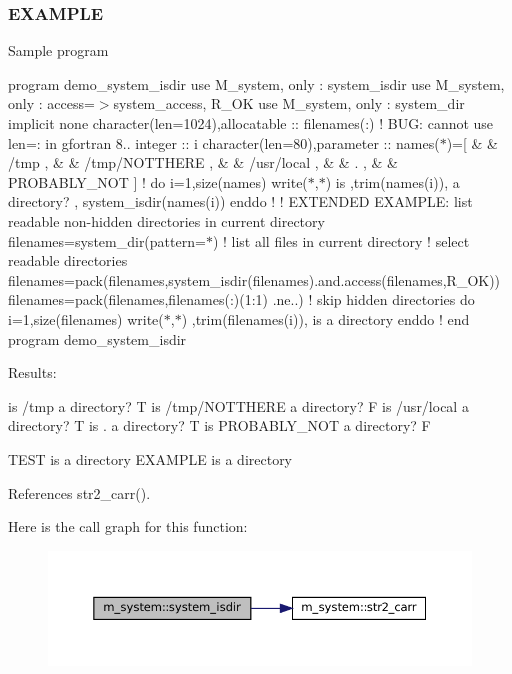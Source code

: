 \subsubsection*{E\+X\+A\+M\+P\+LE}

Sample program

program demo\+\_\+system\+\_\+isdir use M\+\_\+system, only \+: system\+\_\+isdir use M\+\_\+system, only \+: access=$>$system\+\_\+access, R\+\_\+\+OK use M\+\_\+system, only \+: system\+\_\+dir implicit none character(len=1024),allocatable \+:\+: filenames(\+:) ! B\+UG\+: cannot use len=\+: in gfortran 8.. integer \+:\+: i character(len=80),parameter \+:\+: names($\ast$)=\mbox{[} \& \& \textquotesingle{}/tmp \textquotesingle{}, \& \& \textquotesingle{}/tmp/\+N\+O\+T\+T\+H\+E\+RE \textquotesingle{}, \& \& \textquotesingle{}/usr/local \textquotesingle{}, \& \& \textquotesingle{}. \textquotesingle{}, \& \& \textquotesingle{}P\+R\+O\+B\+A\+B\+L\+Y\+\_\+\+N\+OT \textquotesingle{}\mbox{]} ! do i=1,size(names) write($\ast$,$\ast$)\textquotesingle{} is \textquotesingle{},trim(names(i)),\textquotesingle{} a directory? \textquotesingle{}, system\+\_\+isdir(names(i)) enddo ! ! E\+X\+T\+E\+N\+D\+ED E\+X\+A\+M\+P\+LE\+: list readable non-\/hidden directories in current directory filenames=system\+\_\+dir(pattern=\textquotesingle{}$\ast$\textquotesingle{}) ! list all files in current directory ! select readable directories filenames=pack(filenames,system\+\_\+isdir(filenames).and.\+access(filenames,\+R\+\_\+\+O\+K)) filenames=pack(filenames,filenames(\+:)(1\+:1) .ne.\textquotesingle{}.\textquotesingle{}) ! skip hidden directories do i=1,size(filenames) write($\ast$,$\ast$)\textquotesingle{} \textquotesingle{},trim(filenames(i)),\textquotesingle{} is a directory\textquotesingle{} enddo ! end program demo\+\_\+system\+\_\+isdir

Results\+:

is /tmp a directory? T is /tmp/\+N\+O\+T\+T\+H\+E\+RE a directory? F is /usr/local a directory? T is . a directory? T is P\+R\+O\+B\+A\+B\+L\+Y\+\_\+\+N\+OT a directory? F

T\+E\+ST is a directory E\+X\+A\+M\+P\+LE is a directory 

References str2\+\_\+carr().

Here is the call graph for this function\+:\nopagebreak
\begin{figure}[H]
\begin{center}
\leavevmode
\includegraphics[width=350pt]{namespacem__system_a7946ea976f399baff21caebcbe931f6d_cgraph}
\end{center}
\end{figure}
\mbox{\label{namespacem__system_aa2bdb5f75405d87934c10756b539d082}} 

